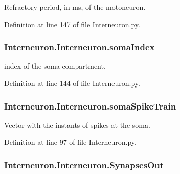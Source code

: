 Refractory period, in ms, of the motoneuron. 



Definition at line 147 of file Interneuron.\+py.

\subsubsection[{\texorpdfstring{soma\+Index}{somaIndex}}]{\setlength{\rightskip}{0pt plus 5cm}Interneuron.\+Interneuron.\+soma\+Index}\hypertarget{class_interneuron_1_1_interneuron_aee67796d78acb7bea5aa67ec3df379a8}{}\label{class_interneuron_1_1_interneuron_aee67796d78acb7bea5aa67ec3df379a8}


index of the soma compartment. 



Definition at line 144 of file Interneuron.\+py.

\subsubsection[{\texorpdfstring{soma\+Spike\+Train}{somaSpikeTrain}}]{\setlength{\rightskip}{0pt plus 5cm}Interneuron.\+Interneuron.\+soma\+Spike\+Train}\hypertarget{class_interneuron_1_1_interneuron_abd4d1f53989f0cb098a92112df37ed8a}{}\label{class_interneuron_1_1_interneuron_abd4d1f53989f0cb098a92112df37ed8a}


Vector with the instants of spikes at the soma. 



Definition at line 97 of file Interneuron.\+py.

\subsubsection[{\texorpdfstring{Synapses\+Out}{SynapsesOut}}]{\setlength{\rightskip}{0pt plus 5cm}Interneuron.\+Interneuron.\+Synapses\+Out}\hypertarget{class_interneuron_1_1_interneuron_acf20c20262841403db13c5d69e4cb840}{}\label{class_interneuron_1_1_interneuron_acf20c20262841403db13c5d69e4cb840}


